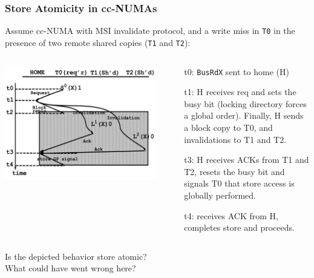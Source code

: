 \documentclass{beamer}
\begin{document}
\begin{frame}[fragile,t]
\frametitle{Store Atomicity in cc-NUMAs}

Assume cc-NUMA with MSI invalidate protocol, and a
write miss in {\tt T0} in the presence of two remote shared copies ({\tt T1} and {\tt T2}): 

\begin{columns}
\includegraphics[width=44ex]{Ch7Figs/StoreAtomccNUMA}\pause
{}
\begin{scriptsize}
\begin{itemize}
    \item[t0:] {\tt BusRdX} sent to home (H)
    \item[t1:] H receives req and sets the busy bit
                (locking directory forces a global order).
                Finally, H sends a block copy to T0,
                and invalidations to T1 and T2.
    \item[t3:] H receives ACKs from T1 and T2, resets the busy bit
                and signals T0 that store access is globally performed.
    \item[t4:] receives ACK from H, completes store and proceeds. 
\end{itemize}
\end{scriptsize}
\end{columns}

\alert{Is the depicted behavior store atomic?}\\
\alert{What could have went wrong here?}

\end{frame}
\end{document}
